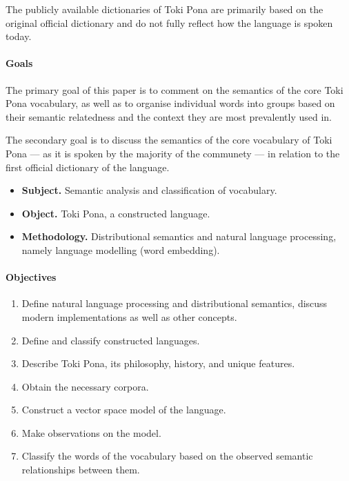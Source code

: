 \documentclass[14pt, a4paper]{extreport}
\begin{document}
The publicly available dictionaries of Toki Pona are primarily based on the original official dictionary \parencite{pu} and do not fully reflect how the language is spoken today.


\paragraph{Goals}
The primary goal of this paper is to comment on the semantics of the core Toki Pona vocabulary, as well as to organise individual words into groups based on their semantic relatedness and the context they are most prevalently used in.

The secondary goal is to discuss the semantics of the core vocabulary of Toki Pona --- as it is spoken by the majority of the communety --- in relation to the first official dictionary of the language.

\begin{itemize}
  \item \textbf{Subject.} Semantic analysis and classification of vocabulary.
  \item \textbf{Object.} Toki Pona, a constructed language.
  \item \textbf{Methodology.} Distributional semantics and natural language processing, namely language modelling (word embedding).
\end{itemize}
\paragraph{Objectives}
\begin{enumerate}
  \item Define natural language processing and distributional semantics, discuss modern implementations as well as other concepts.
  \item Define and classify constructed languages.
  \item Describe Toki Pona, its philosophy, history, and unique features.
  \item Obtain the necessary corpora.
  \item Construct a vector space model of the language.
  \item Make observations on the model.
  \item Classify the words of the vocabulary based on the observed semantic relationships between them.
\end{enumerate}
\end{document}
